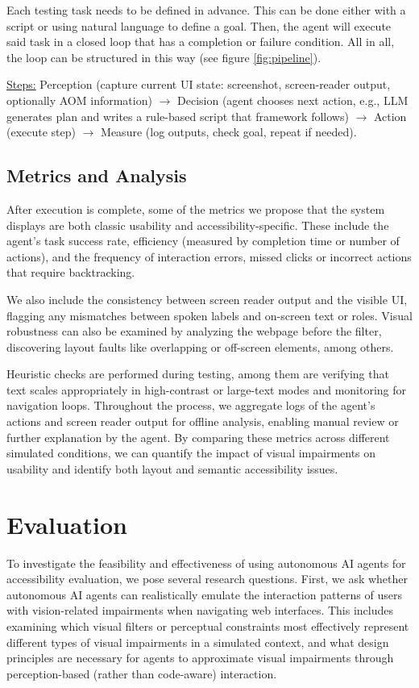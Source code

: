 Each testing task needs to be defined in advance. This can be done either with a script or using natural language to define a goal. Then, the agent will execute said task in a closed loop that has a completion or failure condition. All in all, the loop can be structured in this way (see figure \ref{fig:pipeline}).

\underline{Steps:} Perception (capture current \ac{UI} state: screenshot, screen-reader output, optionally \ac{AOM} information) $\rightarrow$ Decision (agent chooses next action, e.g., LLM generates plan and writes a rule-based script that framework follows) $\rightarrow$ Action (execute step) $\rightarrow$ Measure (log outputs, check goal, repeat if needed).


\subsection{Metrics and Analysis}

After execution is complete, some of the metrics we propose that the system displays are both classic usability and accessibility-specific. These include the agent's task success rate, efficiency (measured by completion time or number of actions), and the frequency of interaction errors, missed clicks or incorrect actions that require backtracking. 

We also include the consistency between screen reader output and the visible \ac{UI}, flagging any mismatches between spoken labels and on-screen text or roles. Visual robustness can also be examined by analyzing the webpage before the filter, discovering layout faults like overlapping or off-screen elements, among others. 

Heuristic checks are performed during testing, among them are verifying that text scales appropriately in high-contrast or large-text modes and monitoring for navigation loops. Throughout the process, we aggregate logs of the agent's actions and screen reader output for offline analysis, enabling manual review or further explanation by the agent. By comparing these metrics across different simulated conditions, we can quantify the impact of visual impairments on usability and identify both layout and semantic accessibility issues.

\section{Evaluation}

To investigate the feasibility and effectiveness of using autonomous AI agents for accessibility evaluation, we pose several research questions. First, we ask whether autonomous AI agents can realistically emulate the interaction patterns of users with vision-related impairments when navigating web interfaces. This includes examining which visual filters or perceptual constraints most effectively represent different types of visual impairments in a simulated context, and what design principles are necessary for agents to approximate visual impairments through perception-based (rather than code-aware) interaction.

